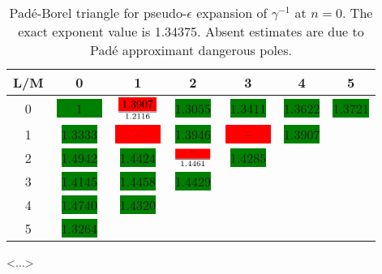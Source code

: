 \documentclass[preprint,preprintnumbers,amsmath,amssymb]{revtex4}
\newcommand{\comment}[1]{} %
\newcommand{\red}[1]{\colorbox{red}{#1}}    %
\newcommand{\green}[1]{\colorbox{green}{#1}}%
\begin{document}
\begin{table}[t]
\caption{Pad\'e-Borel triangle for pseudo-$\epsilon$ expansion of $\gamma^{-1}$ at $n = 0$.
The exact exponent value is 1.34375. Absent estimates are due to Pad\'e approximant
dangerous poles.}
\label{tab7}
\renewcommand{\tabcolsep}{0.4cm}
\begin{tabular}{|*{7}{c|}}\hline
L/M & 0 & 1 & 2 & 3 & 4 & 5 \\ \hline
0 & \green{~~~1~~~} & $\frac{\red{1.3907}}{1.2116}$  & \green{1.3055} & \green{1.3411} & \green{1.3622} & \green{1.3721} \\ \hline
1 & \green{1.3333} & \red{~~~--~~~} & \green{1.3946} & \red{~~~--~~~} & \green{1.3907} & \\ \hline
2 & \green{1.4942} & \green{1.4424} & $\frac{\red{~~~--~~~}}{1.4461}$ & \green{1.4285} & & \\ \hline
3 & \green{1.4145} & \green{1.4458} & \green{1.4429} & & & \\ \hline
4 & \green{1.4740} & \green{1.4320} & & & & \\ \hline
5 & \green{1.3264} & & & & & \\ \hline
\end{tabular}
\end{table}

<$\dots$>
\comment{
\begin{figure}
\begin{center}
\caption{The values of critical exponent $\gamma$ for $n = 1$ as functions of the order
in $\tau$ obtained by direct summation of pseudo-$\epsilon$ expansions (7), (8). Filled
round and triangle mark the points of optimal cut off, i. e. the orders at which
coefficients of the series finish to decrease.}
\label{fig1}
\end{center}
\end{figure}

\begin{figure}
\begin{center}
\caption{The same as in Fig. 1 for the exponent $\nu$ at $n = 0$ (series (14), (15)).}
\label{fig2}
\end{center}
\end{figure}

\begin{figure}
\begin{center}
\caption{Critical exponent $\gamma$ at $n = 0$ as function of order in $\tau$ obtained
by direct summation of series (12), (13).}
\label{fig3}
\end{center}
\end{figure}

\begin{figure}
\begin{center}
\caption{The same as in Fig. 3 for series (9), (10)).}
\label{fig4}
\end{center}
\end{figure}
}
\end{document}
